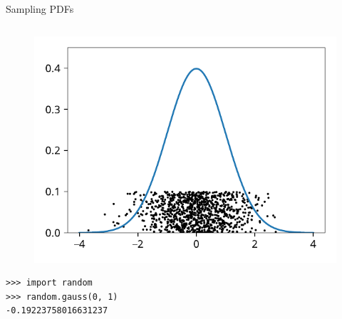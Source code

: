 \documentclass[12pt, aspectratio=149]{beamer}
\theoremstyle{plain}
\begin{document}
\begin{frame}[fragile]{Sampling PDFs}
\begin{columns}
\begin{column}{0.5\textwidth}
\begin{center}
\begin{figure}
			 \includegraphics[width=0.99\linewidth]{figures/normal_samples}
		 \end{figure}
		  \begin{verbatim}
>>> import random
>>> random.gauss(0, 1)
-0.19223758016631237
		  \end{verbatim}
		 \end{center}
	\end{column}
	\end{columns}
\end{frame}
	
\end{document}
